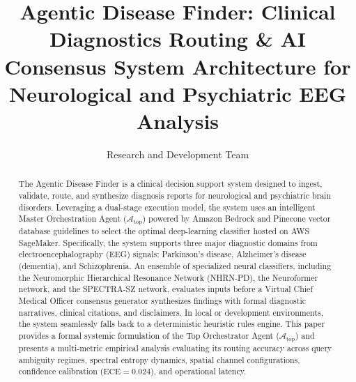 \documentclass[runningheads]{llncs}
\begin{document}
\title{Agentic Disease Finder: Clinical Diagnostics Routing \& AI Consensus System Architecture for Neurological and Psychiatric EEG Analysis}

\author{Research and Development Team}


\maketitle

\begin{abstract}
The Agentic Disease Finder is a clinical decision support system designed to ingest, validate, route, and synthesize diagnosis reports for neurological and psychiatric brain disorders. Leveraging a dual-stage execution model, the system uses an intelligent Master Orchestration Agent ($\mathcal{A}_{\text{top}}$) powered by Amazon Bedrock and Pinecone vector database guidelines to select the optimal deep-learning classifier hosted on AWS SageMaker. Specifically, the system supports three major diagnostic domains from electroencephalography (EEG) signals: Parkinson's disease, Alzheimer's disease (dementia), and Schizophrenia. An ensemble of specialized neural classifiers, including the Neuromorphic Hierarchical Resonance Network (NHRN-PD), the Neuroformer network, and the SPECTRA-SZ network, evaluates inputs before a Virtual Chief Medical Officer consensus generator synthesizes findings with formal diagnostic narratives, clinical citations, and disclaimers. In local or development environments, the system seamlessly falls back to a deterministic heuristic rules engine. This paper provides a formal systemic formulation of the Top Orchestrator Agent ($\mathcal{A}_{\text{top}}$) and presents a multi-metric empirical analysis evaluating its routing accuracy across query ambiguity regimes, spectral entropy dynamics, spatial channel configurations, confidence calibration ($\text{ECE}=0.024$), and operational latency.

\end{abstract}
\end{document}
